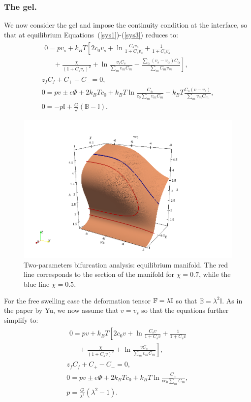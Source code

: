 \subsubsection{The gel.}
We now consider the gel and impose the continuity condition at the interface, so that at equilibrium Equations~(\ref{sys1})-(\ref{sys3}) reduces to:
\begin{gather}
\begin{aligned}
0 = p v_s + k_BT\left[2c_0v_s+\ln \frac{C_s v_s}{1+C_s v_s} + \frac{1}{1+C_sv_s}\right.\\
\left.\ \ \ \ \ \ +\frac{\chi}{(1+C_s v_s)^2} + \ln \frac{v_s C_s}{\sum_m v_mC_m} - \frac{\sum_\alpha (v_s-v_\alpha)C_\alpha}{\sum_m C_m v_m} \right], 
\end{aligned}\\[2.5mm]
z_fC_f+C_+-C_-=0,\\
0 = p v \pm e\Phi + 2k_BTc_0+ k_BT \ln \frac{C_\pm}{c_0\sum_m v_m C_m} - k_BT \frac{C_s (v-v_s)}{\sum_m v_m C_m},\\
0= -p \mathbb{I} + \frac{G}{J}\left(\mathbb{B}-\mathbb{I}\right).
\end{gather}
\begin{figure}[h]
	\includegraphics[scale=0.5]{images/manifold1}
	\caption{Two-parameters bifurcation analysis: equilibrium manifold. The red line corresponds to the section of the manifold for $\chi=0.7$, while the blue line $\chi=0.5$.}
	\label{manifold}
\end{figure}
For the free swelling case the deformation tensor $\mathbb{F}=\lambda\mathbb{I}$ so that $\mathbb{B}=\lambda^2\mathbb{I}$. As in the paper by Yu, we now assume that $v=v_s$ so that the equations further simplify to:
\begin{gather}
\begin{aligned}
0 = p v + k_BT\left[2c_0v+\ln \frac{C_s v}{1+C_s v} + \frac{1}{1+C_sv}\right.\label{temp}\\
\left.\ \ \ \ \ \ +\frac{\chi}{(1+C_s v)^2} + \ln \frac{v C_s}{\sum_m v_mC_m}\right], 
\end{aligned}\\[2.5mm]
z_fC_f+C_+-C_-=0,\\
0 = p v \pm e\Phi + 2k_BTc_0+ k_BT \ln \frac{C_\pm}{vc_0\sum_m C_m} ,\\
p= \frac{G}{\lambda^3}\left(\lambda^2-1\right).
\end{gather}
